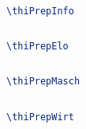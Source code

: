 \documentclass[aspectratio=169]{beamer}
\begin{document}
\begin{frame}[fragile]
    \frametitle{\thifak}
    \begin{lstlisting}[language=TeX]
        \thiPrepInfo
    \end{lstlisting}
\end{frame}

\thiDefaults
\thiPrepElo
\subsection{\thifak}
\def \thititleB {\thifak}
\maketitle

\begin{frame}[fragile]
    \frametitle{\thifak}
    \begin{lstlisting}[language=TeX]
        \thiPrepElo
    \end{lstlisting}
\end{frame}

\thiDefaults
\thiPrepMasch
\subsection{\thifak}
\def \thititleB {\thifak}
\maketitle

\begin{frame}[fragile]
    \frametitle{\thifak}
    \begin{lstlisting}[language=TeX]
        \thiPrepMasch
    \end{lstlisting}
\end{frame}

\thiDefaults
\thiPrepWirt
\subsection{\thifak}
\def \thititleB {\thifak}
\maketitle

\begin{frame}[fragile]
    \frametitle{\thifak}
    \begin{lstlisting}[language=TeX]
        \thiPrepWirt
    \end{lstlisting}
\end{frame}
\end{document}
